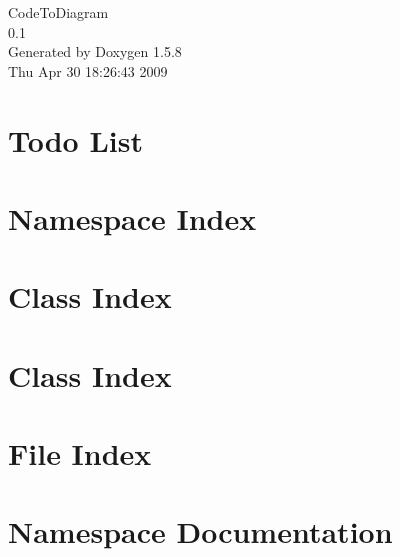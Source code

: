 \documentclass[a4paper]{book}
\begin{document}
\begin{titlepage}
\vspace*{7cm}
\begin{center}
{\Large CodeToDiagram \\[1ex]\large 0.1 }\\
\vspace*{1cm}
{\large Generated by Doxygen 1.5.8}\\
\vspace*{0.5cm}
{\small Thu Apr 30 18:26:43 2009}\\
\end{center}
\end{titlepage}
\clearemptydoublepage
{}
\tableofcontents
\clearemptydoublepage
{}
\chapter{Todo List}
\label{todo}
\hypertarget{todo}{}

\chapter{Namespace Index}

\chapter{Class Index}

\chapter{Class Index}

\chapter{File Index}

\chapter{Namespace Documentation}









\end{document}
